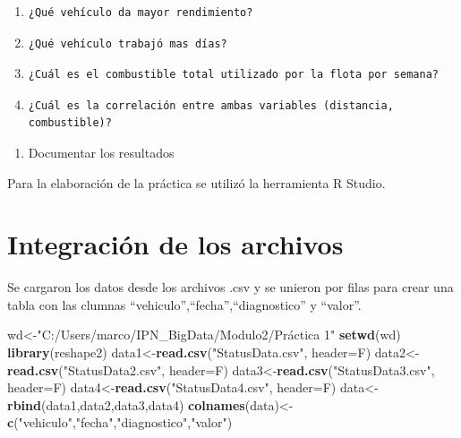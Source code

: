 \documentclass[]{article}
\newenvironment{Shaded}{\begin{snugshade}}{\end{snugshade}}
\newcommand{\KeywordTok}[1]{\textcolor[rgb]{0.13,0.29,0.53}{\textbf{#1}}}
\newcommand{\DataTypeTok}[1]{\textcolor[rgb]{0.13,0.29,0.53}{#1}}
\newcommand{\StringTok}[1]{\textcolor[rgb]{0.31,0.60,0.02}{#1}}
\newcommand{\NormalTok}[1]{#1}
\providecommand{\tightlist}{%
  \setlength{\itemsep}{0pt}\setlength{\parskip}{0pt}}
\begin{document}
\begin{enumerate}
\def\labelenumi{\alph{enumi}.}
\item
\begin{verbatim}
¿Qué vehículo da mayor rendimiento?
\end{verbatim}
\item
\begin{verbatim}
¿Qué vehículo trabajó mas días?
\end{verbatim}
\item
\begin{verbatim}
¿Cuál es el combustible total utilizado por la flota por semana?
\end{verbatim}
\item
\begin{verbatim}
¿Cuál es la correlación entre ambas variables (distancia, combustible)?
\end{verbatim}
\end{enumerate}

\begin{enumerate}
\def\labelenumi{\arabic{enumi}.}
\setcounter{enumi}{6}
\tightlist
\item
  Documentar los resultados
\end{enumerate}

Para la elaboración de la práctica se utilizó la herramienta R Studio.

\section{Integración de los archivos}\label{integracion-de-los-archivos}

Se cargaron los datos desde los archivos .csv y se unieron por filas
para crear una tabla con las clumnas
``vehiculo'',``fecha'',``diagnostico'' y ``valor''.

\begin{Shaded}
\begin{Highlighting}[]
\NormalTok{wd<-}\StringTok{"C:/Users/marco/IPN_BigData/Modulo2/Práctica 1"}
\KeywordTok{setwd}\NormalTok{(wd)}
\KeywordTok{library}\NormalTok{(reshape2)}
\NormalTok{data1<-}\KeywordTok{read.csv}\NormalTok{(}\StringTok{"StatusData.csv"}\NormalTok{, }\DataTypeTok{header=}\NormalTok{F)}
\NormalTok{data2<-}\KeywordTok{read.csv}\NormalTok{(}\StringTok{"StatusData2.csv"}\NormalTok{, }\DataTypeTok{header=}\NormalTok{F)}
\NormalTok{data3<-}\KeywordTok{read.csv}\NormalTok{(}\StringTok{"StatusData3.csv"}\NormalTok{, }\DataTypeTok{header=}\NormalTok{F)}
\NormalTok{data4<-}\KeywordTok{read.csv}\NormalTok{(}\StringTok{"StatusData4.csv"}\NormalTok{, }\DataTypeTok{header=}\NormalTok{F)}
\NormalTok{data<-}\KeywordTok{rbind}\NormalTok{(data1,data2,data3,data4)}
\KeywordTok{colnames}\NormalTok{(data)<-}\KeywordTok{c}\NormalTok{(}\StringTok{"vehiculo"}\NormalTok{,}\StringTok{"fecha"}\NormalTok{,}\StringTok{"diagnostico"}\NormalTok{,}\StringTok{"valor"}\NormalTok{)}
\end{Highlighting}
\end{Shaded}
\end{document}
